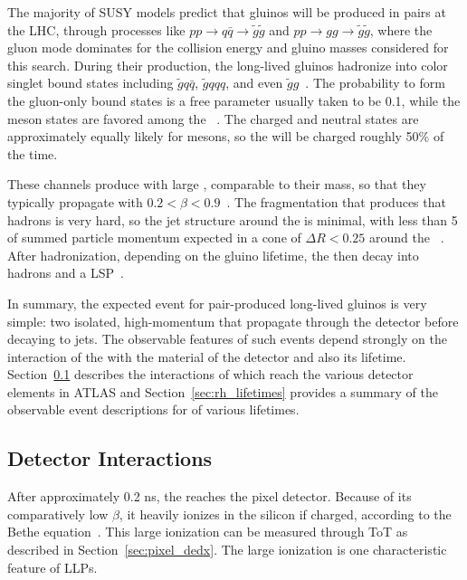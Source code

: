 The majority of SUSY models predict that gluinos will be produced in pairs at the \ac{LHC}, through processes like $p p \rightarrow q\bar{q} \rightarrow \tilde{g}\tilde{g}$ and $p p \rightarrow g g \rightarrow \tilde{g}\tilde{g}$, where the gluon mode dominates for the collision energy and gluino masses considered for this search.
During their production, the long-lived gluinos hadronize into color singlet bound states including $\tilde{g}q\bar{q}$, $\tilde{g}qqq$, and even $\tilde{g}g$~\cite{rhadron}.
The probability to form the gluon-only bound states is a free parameter usually taken to be 0.1, while the meson states are favored among the \rhadrons~\cite{rhad_atlas}.
The charged and neutral states are approximately equally likely for mesons, so the \rhadrons will be charged roughly 50\% of the time.

These channels produce \rhadrons with large \pt, comparable to their mass, so that they typically propagate with $0.2 < \beta < 0.9$~\cite{rhad_atlas}.
The fragmentation that produces that hadrons is very hard, so the jet structure around the \rhadron is minimal, with less than 5 \GeV of summed particle momentum expected in a cone of $\Delta R < 0.25$ around the \rhadron~\cite{rhad_atlas}.
After hadronization, depending on the gluino lifetime, the \rhadrons then decay into hadrons and a \ac{LSP}~\cite{rhadron}.

In summary, the expected event for pair-produced long-lived gluinos is very simple: two isolated, high-momentum \rhadrons that propagate through the detector before decaying to jets.
The observable features of such events depend strongly on the interaction of the \rhadron with the material of the detector and also its lifetime.
Section~\ref{sec:rh_interactions} describes the interactions of \rhadrons which reach the various detector elements in \ac{ATLAS} and Section~\ref{sec:rh_lifetimes} provides a summary of the observable event descriptions for \rhadrons of various lifetimes.

\subsection{Detector Interactions}
\label{sec:rh_interactions}

After approximately 0.2 ns, the \rhadron reaches the pixel detector.
Because of its comparatively low $\beta$, it heavily ionizes in the silicon if charged, according to the Bethe equation~\cite{pdg}.
This large ionization can be measured through \ac{ToT} as described in Section~\ref{sec:pixel_dedx}.
The large ionization is one characteristic feature of \acp{LLP}.

